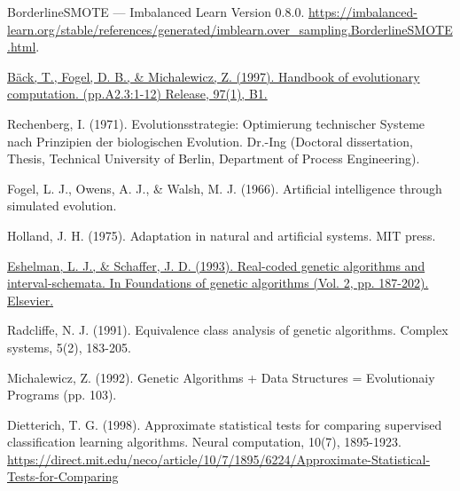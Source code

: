 \begin{thebibliography}{9}
	BorderlineSMOTE — Imbalanced Learn Version 0.8.0. \url{https://imbalanced-learn.org/stable/references/generated/imblearn.over_sampling.BorderlineSMOTE.html}.



	\href{https://www.researchgate.net/publication/216300863_A_history_of_evolutionary_computation}{Bäck, T., Fogel, D. B., \& Michalewicz, Z. (1997). Handbook of evolutionary computation. (pp.A2.3:1-12) Release, 97(1), B1.}


	Rechenberg, I. (1971). Evolutionsstrategie: Optimierung technischer Systeme nach Prinzipien der biologischen Evolution. Dr.-Ing (Doctoral dissertation, Thesis, Technical University of Berlin, Department of Process Engineering).


	Fogel, L. J., Owens, A. J., \& Walsh, M. J. (1966). Artificial intelligence through simulated evolution.


	Holland, J. H. (1975). Adaptation in natural and artificial systems. MIT press.


	\href{https://www.sciencedirect.com/science/article/pii/B9780080948324500180}{Eshelman, L. J., \& Schaffer, J. D. (1993). Real-coded genetic algorithms and interval-schemata. In Foundations of genetic algorithms (Vol. 2, pp. 187-202). Elsevier.}


	Radcliffe, N. J. (1991). Equivalence class analysis of genetic algorithms. Complex systems, 5(2), 183-205.


	Michalewicz, Z. (1992). Genetic Algorithms + Data Structures = Evolutionaiy Programs (pp. 103).



	Dietterich, T. G. (1998). Approximate statistical tests for comparing supervised classification learning algorithms. Neural computation, 10(7), 1895-1923. \url{https://direct.mit.edu/neco/article/10/7/1895/6224/Approximate-Statistical-Tests-for-Comparing}


\end{thebibliography}
